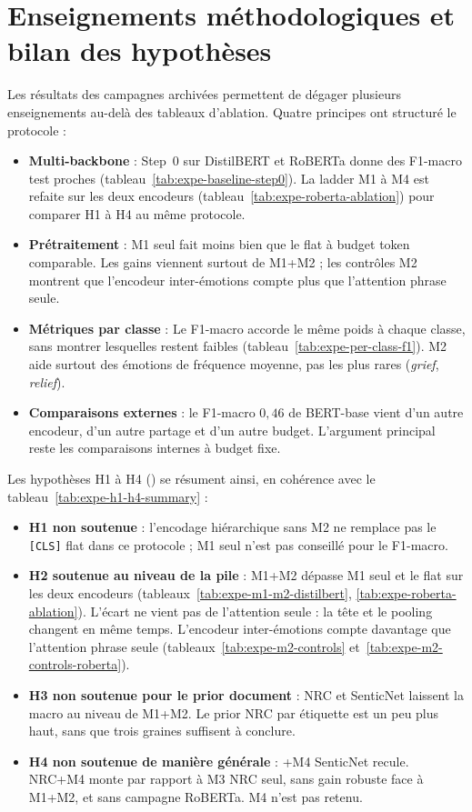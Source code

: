 \section{Enseignements méthodologiques et bilan des hypothèses}
\label{sec:expe-enseignements}

Les résultats des campagnes archivées permettent de dégager plusieurs
enseignements au-delà des tableaux d'ablation. Quatre principes ont
structuré le protocole :
\begin{itemize}
\item \textbf{Multi-backbone} : Step~0 sur DistilBERT et RoBERTa donne
      des F1-macro test proches (tableau~\ref{tab:expe-baseline-step0}).
      La ladder M1 à M4 est refaite sur les deux encodeurs
      (tableau~\ref{tab:expe-roberta-ablation}) pour comparer H1 à H4 au
      même protocole.
\item \textbf{Prétraitement} : M1 seul fait moins bien que le flat à
      budget token comparable. Les gains viennent surtout de M1+M2 ; les
      contrôles M2 montrent que l'encodeur inter-émotions compte plus que
      l'attention phrase seule.
\item \textbf{Métriques par classe} : Le F1-macro accorde le même poids
      à chaque classe, sans montrer lesquelles restent faibles
      (tableau~\ref{tab:expe-per-class-f1}). M2 aide surtout des
      émotions de fréquence moyenne, pas les plus rares (\emph{grief},
      \emph{relief}).
\item \textbf{Comparaisons externes} : le F1-macro $0{,}46$ de
      BERT-base \cite{demszky2020} vient d'un autre encodeur, d'un autre
      partage et d'un autre budget. L'argument principal reste les
      comparaisons internes à budget fixe.
\end{itemize}

Les hypothèses H1 à H4 () se résument
ainsi, en cohérence avec le tableau~\ref{tab:expe-h1-h4-summary} :
\begin{itemize}
\item \textbf{H1 non soutenue} : l'encodage hiérarchique sans M2 ne
      remplace pas le \texttt{[CLS]} flat dans ce protocole ; M1 seul
      n'est pas conseillé pour le F1-macro.
\item \textbf{H2 soutenue au niveau de la pile} : M1+M2 dépasse M1 seul
      et le flat sur les deux encodeurs
      (tableaux~\ref{tab:expe-m1-m2-distilbert},
      \ref{tab:expe-roberta-ablation}). L'écart ne vient pas de
      l'attention seule : la tête et le pooling changent en même temps.
      L'encodeur inter-émotions compte davantage que l'attention phrase
      seule (tableaux~\ref{tab:expe-m2-controls}
      et~\ref{tab:expe-m2-controls-roberta}).
\item \textbf{H3 non soutenue pour le prior document} : NRC et
      SenticNet laissent la macro au niveau de M1+M2. Le prior NRC par
      étiquette est un peu plus haut, sans que trois graines suffisent
      à conclure.
\item \textbf{H4 non soutenue de manière générale} : +M4 SenticNet
      recule. NRC+M4 monte par rapport à M3 NRC seul, sans gain robuste
      face à M1+M2, et sans campagne RoBERTa. M4 n'est pas retenu.
\end{itemize}

